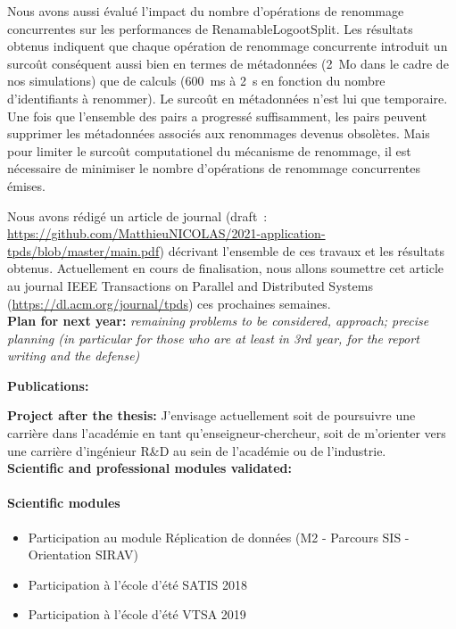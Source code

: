 \documentclass[12pt]{article}
\newcommand{\commentaire}[1]{\small\textit{#1}}
\begin{document}
Nous avons aussi évalué l'impact du nombre d'opérations de renommage concurrentes sur les performances de RenamableLogootSplit.
Les résultats obtenus indiquent que chaque opération de renommage concurrente introduit un surcoût conséquent aussi bien en termes de métadonnées (\SI{2}{\mega o} dans le cadre de nos simulations) que de calculs (\SI{600}{\milli\second} à \SI{2}{\second} en fonction du nombre d'identifiants à renommer).
Le surcoût en métadonnées n'est lui que temporaire.
Une fois que l'ensemble des pairs a progressé suffisamment, les pairs peuvent supprimer les métadonnées associés aux renommages devenus obsolètes.
Mais pour limiter le surcoût computationel du mécanisme de renommage, il est nécessaire de minimiser le nombre d'opérations de renommage concurrentes émises.

Nous avons rédigé un article de journal (draft~: \url{https://github.com/MatthieuNICOLAS/2021-application-tpds/blob/master/main.pdf}) décrivant l'ensemble de ces travaux et les résultats obtenus.
Actuellement en cours de finalisation, nous allons soumettre cet article au journal IEEE Transactions on Parallel and Distributed Systems (\url{https://dl.acm.org/journal/tpds}) ces prochaines semaines.
\\


\noindent\textbf{Plan for next year:}
\commentaire{%
  remaining problems to be considered, approach; precise planning (in
  particular for those who are at least in 3rd year, for the report
  writing and the defense)\\}

\noindent\textbf{Publications:}


\nocite{*}

\noindent\textbf{Project after the thesis:}
J'envisage actuellement soit de poursuivre une carrière dans l'académie en tant qu'enseigneur-chercheur, soit de m'orienter vers une carrière d'ingénieur R\&D au sein de l'académie ou de l'industrie.
\\

\noindent\textbf{Scientific and professional modules validated:}
\paragraph{\footnotesize Scientific modules}
  \begin{itemize}
      \itemsep0em
      \item Participation au module Réplication de données (M2 - Parcours SIS - Orientation SIRAV)
      \item Participation à l'école d'été SATIS 2018
      \item Participation à l'école d'été VTSA 2019
  \end{itemize}
\end{document}
